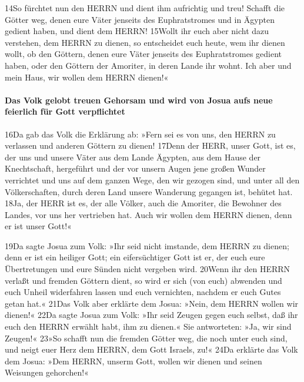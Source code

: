 14So fürchtet nun den HERRN und dient ihm aufrichtig und treu! Schafft
die Götter weg, denen eure Väter jenseits des Euphratstromes und in
Ägypten gedient haben, und dient dem HERRN! 15Wollt ihr euch aber nicht
dazu verstehen, dem HERRN zu dienen, so entscheidet euch heute, wem ihr
dienen wollt, ob den Göttern, denen eure Väter jenseits des
Euphratstromes gedient haben, oder den Göttern der Amoriter, in deren
Lande ihr wohnt. Ich aber und mein Haus, wir wollen dem HERRN dienen!«

\hypertarget{das-volk-gelobt-treuen-gehorsam-und-wird-von-josua-aufs-neue-feierlich-fuxfcr-gott-verpflichtet}{%
\paragraph{Das Volk gelobt treuen Gehorsam und wird von Josua aufs neue
feierlich für Gott
verpflichtet}\label{das-volk-gelobt-treuen-gehorsam-und-wird-von-josua-aufs-neue-feierlich-fuxfcr-gott-verpflichtet}}

16Da gab das Volk die Erklärung ab: »Fern sei es von uns, den HERRN zu
verlassen und anderen Göttern zu dienen! 17Denn der HERR, unser Gott,
ist es, der uns und unsere Väter aus dem Lande Ägypten, aus dem Hause
der Knechtschaft, hergeführt und der vor unsern Augen jene großen Wunder
verrichtet und uns auf dem ganzen Wege, den wir gezogen sind, und unter
all den Völkerschaften, durch deren Land unsere Wanderung gegangen ist,
behütet hat. 18Ja, der HERR ist es, der alle Völker, auch die Amoriter,
die Bewohner des Landes, vor uns her vertrieben hat. Auch wir wollen dem
HERRN dienen, denn er ist unser Gott!«

19Da sagte Josua zum Volk: »Ihr seid nicht imstande, dem HERRN zu
dienen; denn er ist ein heiliger Gott; ein eifersüchtiger Gott ist er,
der euch eure Übertretungen und eure Sünden nicht vergeben wird. 20Wenn
ihr den HERRN verlaßt und fremden Göttern dient, so wird er sich (von
euch) abwenden und euch Unheil widerfahren lassen und euch vernichten,
nachdem er euch Gutes getan hat.« 21Das Volk aber erklärte dem Josua:
»Nein, dem HERRN wollen wir dienen!« 22Da sagte Josua zum Volk: »Ihr
seid Zeugen gegen euch selbst, daß ihr euch den HERRN erwählt habt, ihm
zu dienen.« Sie antworteten: »Ja, wir sind Zeugen!« 23»So schafft nun
die fremden Götter weg, die noch unter euch sind, und neigt euer Herz
dem HERRN, dem Gott Israels, zu!« 24Da erklärte das Volk dem Josua: »Dem
HERRN, unserm Gott, wollen wir dienen und seinen Weisungen gehorchen!«

